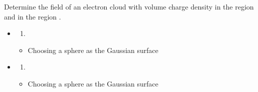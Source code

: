 
\begin{ELexample}{}

Determine the field  of an electron cloud with volume charge density  in the region  and  in the region .


\begin{ELsolution}


\begin{itemize}
\item
  \begin{enumerate}
  \def\labelenumi{(\alph{enumi})}
  \tightlist
  \item
  \end{enumerate}

  \begin{itemize}
  \tightlist
  \item
    Choosing a sphere as the Gaussian surface
  \end{itemize}
\end{itemize}


\begin{itemize}
\item
  \begin{enumerate}
  \def\labelenumi{(\alph{enumi})}
  \setcounter{enumi}{1}
  \tightlist
  \item
  \end{enumerate}

  \begin{itemize}
  \tightlist
  \item
    Choosing a sphere as the Gaussian surface
  \end{itemize}
\end{itemize}


\end{ELsolution}

\end{ELexample}

